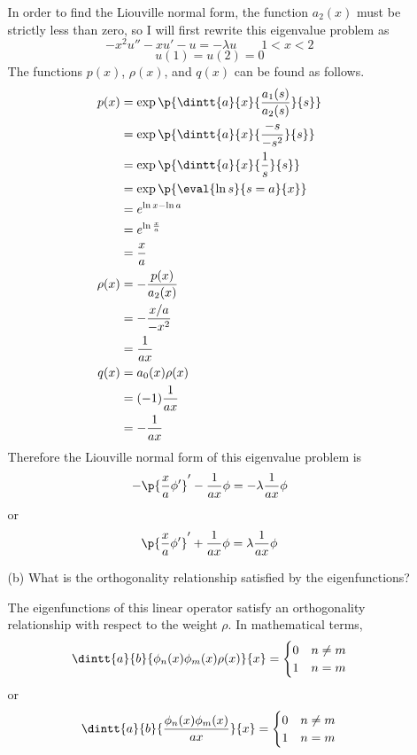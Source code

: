\documentclass[11pt, oneside]{article}
\begin{document}
\begin{enumerate}
\begin{enumerate}
        In order to find the Liouville normal form, the function $a_2(x)$ must
        be strictly less than zero, so I will first rewrite this eigenvalue
        problem as
        \[
          -x^2 u'' - xu' - u = -\lambda u \qquad 1 < x < 2
        \]
        \[
          u(1) = u(2) = 0
        \]
        The functions $p(x)$, $\rho(x)$, and $q(x)$ can be found as follows.
        \begin{align*}
          p(x) &= \exp\p{\dintt{a}{x}{\frac{a_1(s)}{a_2(s)}}{s}} \\
          &= \exp\p{\dintt{a}{x}{\frac{-s}{-s^2}}{s}} \\
          &= \exp\p{\dintt{a}{x}{\frac{1}{s}}{s}} \\
          &= \exp\p{\eval{\ln{s}}{s = a}{x}} \\
          &= e^{\ln{x} - \ln{a}} \\
          &= e^{\ln{\frac{x}{a}}} \\
          &= \frac{x}{a} \\
          \rho(x) &= - \frac{p(x)}{a_2(x)} \\
          &= - \frac{x/a}{-x^2} \\
          &= \frac{1}{ax} \\
          q(x) &= a_0(x) \rho(x) \\
          &= (-1)\frac{1}{ax}\\
          &= -\frac{1}{ax}\\
        \end{align*}
        Therefore the Liouville normal form of this eigenvalue problem is
        \[
          -\p{\frac{x}{a} \phi'}' - \frac{1}{ax} \phi = -\lambda \frac{1}{ax} \phi
        \]
        or
        \[
          \p{\frac{x}{a} \phi'}' + \frac{1}{ax} \phi = \lambda \frac{1}{ax} \phi
        \]

      \item[(b)] %
        What is the orthogonality relationship satisfied by the eigenfunctions?

        The eigenfunctions of this linear operator satisfy an orthogonality
        relationship with respect to the weight $\rho$.
        In mathematical terms,
        \[
          \dintt{a}{b}{\phi_n(x) \phi_m(x) \rho(x)}{x} =
          \begin{cases}
            0 & n \neq m \\
            1 & n = m
          \end{cases}
        \]
        or
        \[
          \dintt{a}{b}{\frac{\phi_n(x) \phi_m(x)}{ax}}{x} =
          \begin{cases}
            0 & n \neq m \\
            1 & n = m
          \end{cases}
        \]


\end{enumerate}
\end{enumerate}
\end{document}
